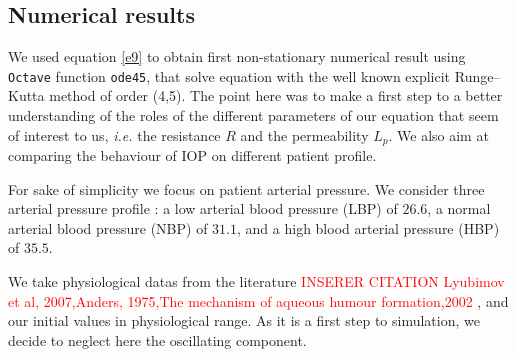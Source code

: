 \subsection{Numerical results}
We used equation \eqref{e9} to obtain first non-stationary numerical result using \texttt{Octave} function \texttt{ode45}, that solve equation with the well known explicit Runge–Kutta method of order (4,5).  The point here was to make a first step to a better understanding of the roles of the different parameters of our equation that seem of interest to us, \textit{i.e.} the resistance $R$ and the permeability $L_p$. We also aim at comparing the behaviour of IOP on different patient profile. 

For sake of simplicity we focus on patient arterial pressure. We consider three arterial pressure profile : a low arterial blood pressure  (LBP) of $26.6$, a normal arterial blood pressure (NBP) of $31.1$, and a high blood arterial pressure (HBP) of $35.5$.

We take physiological datas from the literature \textcolor{red}{INSERER CITATION Lyubimov et al, 2007,Anders, 1975,The mechanism of aqueous humour
formation,2002 \cite{??}}, and our initial values in physiological range. As it is a first step to simulation, we decide to neglect here the oscillating component. 

